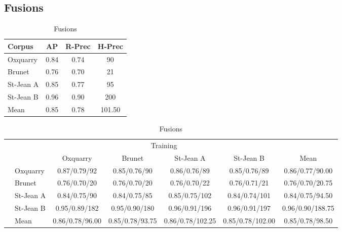 \subsection{Fusions}

\begin{table}[H]
  \centering
  \label{tab:fusions_scores}
  \caption{Fusions}

  \begin{tabular}{l c c c}
    \toprule
    Corpus         & AP   & R-Prec & H-Prec \\
    \midrule
    Oxquarry       & 0.84 & 0.74 & 90 \\
    Brunet         & 0.76 & 0.70 & 21 \\
    St-Jean A      & 0.85 & 0.77 & 95 \\
    St-Jean B      & 0.96 & 0.90 & 200 \\
    \midrule
    Mean           & 0.85 & 0.78 & 101.50 \\
    \bottomrule
  \end{tabular}

  \vspace{0.5cm}

  \begin{tabular}{l l| c c c c|c}
    \toprule
    \multicolumn{2}{c}{\multirow{2}{*}{}} & \multicolumn{4}{c}{Training} \\
    \multicolumn{2}{c}{} & Oxquarry & Brunet & St-Jean A & St-Jean B & Mean \\
    \midrule
    \parbox[t]{2mm}{}
    & Oxquarry  & 0.87/0.79/92 & 0.85/0.76/90 & 0.86/0.76/89 & 0.85/0.76/89 & 0.86/0.77/90.00 \\
    & Brunet    & 0.76/0.70/20 & 0.76/0.70/20 & 0.76/0.70/22 & 0.76/0.71/21 & 0.76/0.70/20.75 \\
    & St-Jean A & 0.84/0.75/90 & 0.84/0.75/85 & 0.85/0.75/102 & 0.84/0.74/101 & 0.84/0.75/94.50 \\
    & St-Jean B & 0.95/0.89/182 & 0.95/0.90/180 & 0.96/0.91/196 & 0.96/0.91/197 & 0.96/0.90/188.75 \\
    \midrule
    & Mean      & 0.86/0.78/96.00 & 0.85/0.78/93.75 & 0.86/0.78/102.25 & 0.85/0.78/102.00 & 0.85/0.78/98.50 \\
    \bottomrule
  \end{tabular}

\end{table}
